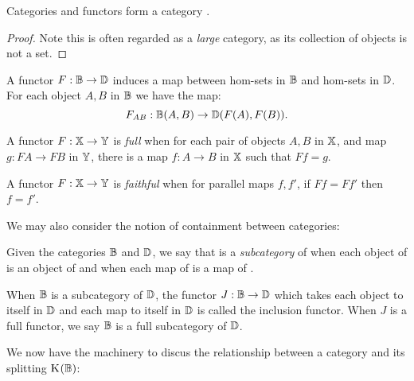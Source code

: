\begin{lemma}\label{lem:cat_is_a_category}
  Categories and functors form a category \cat.
\end{lemma}
\begin{proof}
  \prepprooflist
  Note this is often regarded as a \emph{large} category, as its collection of objects is not a set.
\end{proof}


A functor $F:\mathbb{B} \to \mathbb{D}$ induces a map between hom-sets in $\mathbb{B}$ and hom-sets in $\mathbb{D}$. For
each object $A,B$ in $\mathbb{B}$ we have the map:
\[
  F_{AB} : \mathbb{B}(A,B) \to \mathbb{D}(F(A),F(B)).
\]

\begin{definition}\label{def:full_functor}
  A functor $F:\mathbb{X}\to\mathbb{Y}$ is \emph{full} when for each pair of objects $A,B$ in $\mathbb{X}$, and map
  $g:FA \to F B$ in $\mathbb{Y}$, there is a map $f:A\to B$ in $\mathbb{X}$ such that $F f = g$.
\end{definition}

\begin{definition}\label{def:faithful_functor}
  A functor $F:\mathbb{X}\to\mathbb{Y}$ is \emph{faithful} when for parallel maps $f, f'$, if $Ff = Ff'$ then $f = f'$.
\end{definition}
We may also consider the notion of containment between categories:

\begin{definition}\label{def:subcategories}
  Given the categories $\mathbb{B}$ and $\mathbb{D}$, we say that \B is a \emph{subcategory} of \D when each object
  of \B is an object of \D and when each map of \B is a map of \D.
\end{definition}

When $\mathbb{B}$ is a subcategory of $\mathbb{D}$, the functor $J:\mathbb{B} \to \mathbb{D}$ which takes each object to itself in
$\mathbb{D}$ and each map to itself in $\mathbb{D}$ is called the inclusion functor. When $J$ is a full functor, we
say $\mathbb{B}$ is a full subcategory of $\mathbb{D}$.

We now have the machinery to discus the relationship between a category \B and its splitting
$\text{K}_{}(\mathbb{B})$:

